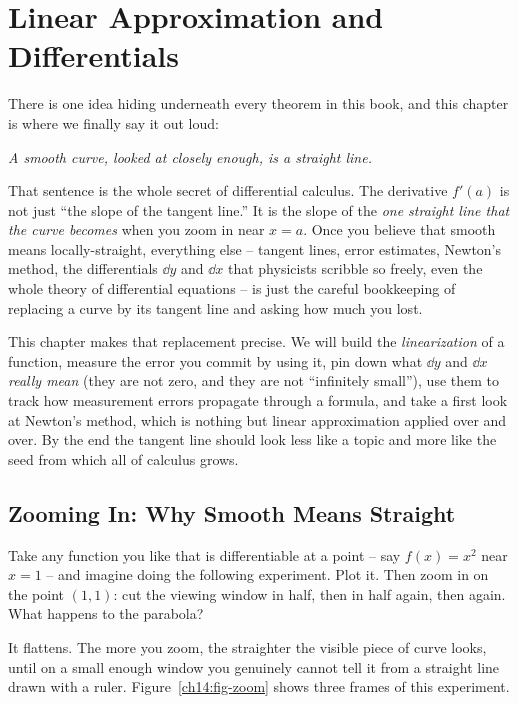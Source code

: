 \chapter{Linear Approximation and Differentials}

There is one idea hiding underneath every theorem in this book, and this chapter
is where we finally say it out loud:

\begin{center}
\emph{A smooth curve, looked at closely enough, is a straight line.}
\end{center}

That sentence is the whole secret of differential calculus. The derivative
$f'(a)$ is not just ``the slope of the tangent line.'' It is the slope of the
\emph{one straight line that the curve becomes} when you zoom in near $x=a$. Once
you believe that smooth means locally-straight, everything else -- tangent
lines, error estimates, Newton's method, the differentials $\dd y$ and $\dd x$
that physicists scribble so freely, even the whole theory of differential
equations -- is just the careful bookkeeping of replacing a curve by its tangent
line and asking how much you lost.

This chapter makes that replacement precise. We will build the
\emph{linearization} of a function, measure the error you commit by using it,
pin down what $\dd y$ and $\dd x$ \emph{really mean} (they are not zero,
and they are not ``infinitely small''), use them to track how measurement errors
propagate through a formula, and take a first look at Newton's method, which is
nothing but linear approximation applied over and over. By the end the tangent
line should look less like a topic and more like the seed from which all of
calculus grows.

\chapterline

\section{Zooming In: Why Smooth Means Straight}
\label{ch14:zooming}

Take any function you like that is differentiable at a point -- say
$f(x)=x^2$ near $x=1$ -- and imagine doing the following experiment. Plot it.
Then zoom in on the point $(1,1)$: cut the viewing window in half, then in half
again, then again. What happens to the parabola?

It flattens. The more you zoom, the straighter the visible piece of curve looks,
until on a small enough window you genuinely cannot tell it from a straight line
drawn with a ruler. Figure~\ref{ch14:fig-zoom} shows three frames of this
experiment.

